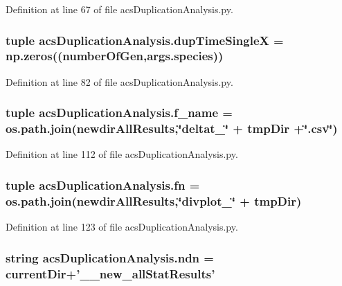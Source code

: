 Definition at line 67 of file acs\-Duplication\-Analysis.\-py.

\hypertarget{a00094_aebf6e36a8ab4ee728eb30781f25cbba2}{
\subsubsection[{dup\-Time\-Single\-X}]{\setlength{\rightskip}{0pt plus 5cm}tuple acs\-Duplication\-Analysis.\-dup\-Time\-Single\-X = np.\-zeros(({\bf number\-Of\-Gen},{\bf args.\-species}))}}\label{a00094_aebf6e36a8ab4ee728eb30781f25cbba2}


Definition at line 82 of file acs\-Duplication\-Analysis.\-py.

\hypertarget{a00094_a6e5f6f3f617f9d327da64d8cb492cc6f}{
\subsubsection[{f\-\_\-name}]{\setlength{\rightskip}{0pt plus 5cm}tuple acs\-Duplication\-Analysis.\-f\-\_\-name = os.\-path.\-join({\bf newdir\-All\-Results},\char`\"{}deltat\-\_\-\char`\"{} + tmp\-Dir +\char`\"{}.csv\char`\"{})}}\label{a00094_a6e5f6f3f617f9d327da64d8cb492cc6f}


Definition at line 112 of file acs\-Duplication\-Analysis.\-py.

\hypertarget{a00094_a668f6f31c1cf7235d2843b0b5f95b08d}{
\subsubsection[{fn}]{\setlength{\rightskip}{0pt plus 5cm}tuple acs\-Duplication\-Analysis.\-fn = os.\-path.\-join({\bf newdir\-All\-Results},\char`\"{}divplot\-\_\-\char`\"{} + tmp\-Dir)}}\label{a00094_a668f6f31c1cf7235d2843b0b5f95b08d}


Definition at line 123 of file acs\-Duplication\-Analysis.\-py.

\hypertarget{a00094_a8f37d6ca1d77d4f1402584470a097308}{
\subsubsection[{ndn}]{\setlength{\rightskip}{0pt plus 5cm}string acs\-Duplication\-Analysis.\-ndn = {\bf current\-Dir}+'\-\_\-\_\-new\-\_\-all\-Stat\-Results'}}\label{a00094_a8f37d6ca1d77d4f1402584470a097308}


